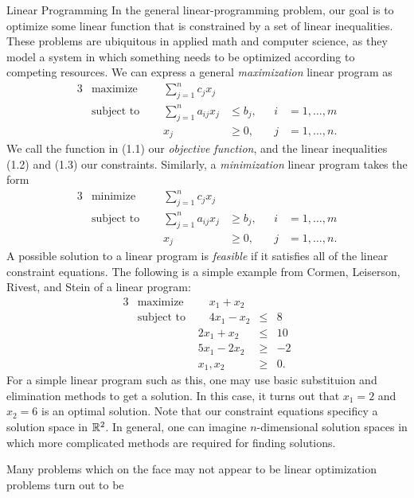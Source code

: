 \begin{section}{Linear Programming}
	In the general linear-programming problem, our goal is to optimize some linear function that 
	is constrained by a set of linear inequalities. These problems are ubiquitous in applied math 
	and computer science, as they model a system in which something needs to be optimized according 
	to competing resources. We can express a general \emph{maximization} linear program as
	\begin{alignat}{3}
		& \text{maximize } & \sum_{j=1}^{n} c_{j} x_{j}& \\
		& \text{subject to } \quad & \sum_{j=1}^{n} a_{ij} x_{j} & \leq b_{j}, & i & = 1, \dots 
		, m \\
				&& x_{j} & \geq 0, \quad & j & = 1, \dots, n.
	\end{alignat}
	We call the function in (1.1) our \emph{objective function}, and the linear inequalities (1.2) 
	and (1.3) our constraints. Similarly, a \emph{minimization} linear program takes the form
	\begin{alignat}{3}
		& \text{minimize } & \sum_{j=1}^{n} c_{j} x_{j}& \\
		& \text{subject to } \quad & \sum_{j=1}^{n} a_{ij} x_{j} & \geq b_{j}, & i & = 1, \dots 
		, m \\
				&& x_{j} & \geq 0, \quad & j & = 1, \dots, n.
	\end{alignat}
	A possible solution to a linear program is \emph{feasible} if it satisfies all of the linear 
	constraint equations. The following is a simple example from Cormen, Leiserson, Rivest, 
	and Stein \cite{cormen2009introduction} of a linear program:
	\begin{alignat*}{3}
		& \text{maximize } &\quad x_1 + x_2 & \\
		& \text{subject to } &\quad 4x_1 - x_2 &\leq &8 \\
				     && 2x_1 + x_2 &\leq &10 \\
				     && 5x_1 - 2x_2 &\geq &-2 \\
				     && x_1,x_2 & \geq &0.
	\end{alignat*}
	For a simple linear program such as this, one may use basic substituion and elimination methods 
	to get a solution. In this case, it turns out that $x_1 = 2$ and $x_2 = 6$ is an optimal 
	solution. Note that our 
	constraint equations specificy a solution space in $\mathbb{R}^2$. In general, one can imagine 
	$n$-dimensional solution spaces in which more complicated methods are required for 
	finding solutions.

\end{section}
	Many problems which on the face may not appear to be linear optimization problems turn out to be 
